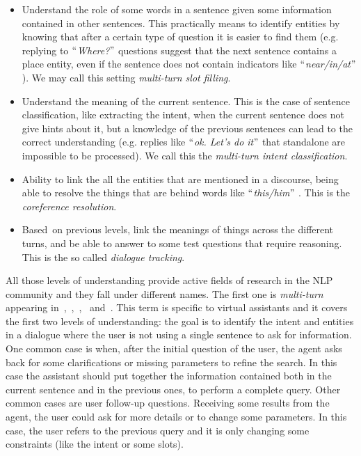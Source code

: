 \begin{itemize}
	\item Understand the role of some words in a sentence given some information contained in other sentences. This practically means to identify entities by knowing that after a certain type of question it is easier to find them (e.g. replying to $``$\textit{Where?}$"$  questions suggest that the next sentence contains a place entity, even if the sentence does not contain indicators like $``$\textit{near/in/at}$"$ ). We may call this setting \textit{multi-turn slot filling}.

	\item Understand the meaning of the current sentence. This is the case of sentence classification, like extracting the intent, when the current sentence does not give hints about it, but a knowledge of the previous sentences can lead to the correct understanding (e.g. replies like $``$\textit{ok. Let's do it}$"$  that standalone are impossible to be processed). We call this the \textit{multi-turn intent classification}.

	\item Ability to link the all the entities that are mentioned in a discourse, being able to resolve the things that are behind words like $``$\textit{this/him}$"$ . This is the \textit{coreference resolution}.

	\item Based\ on previous levels, link the meanings of things across the different turns, and be able to answer to some test questions that require reasoning. This is the so called  \textit{dialogue tracking}.
\end{itemize}

All those levels of understanding provide active fields of research in the NLP community and they fall under different names. The first one is \textit{multi-turn} appearing in~\cite{chen2016end},~\cite{chen2017dynamic},~\cite{xu2014contextual},~\cite{bhargava2013easy} and~\cite{shi2015contextual}. This term is specific to virtual assistants and it covers the first two levels of understanding: the goal is to identify the intent and entities in a dialogue where the user is not using a single sentence to ask for information. One common case is when, after the initial question of the user, the agent asks back for some clarifications or missing parameters to refine the search. In this case the assistant should put together the information contained both in the current sentence and in the previous ones, to perform a complete query. Other common cases are user follow-up questions. Receiving some results from the agent, the user could ask for more details or to change some parameters. In this case, the user refers to the previous query and it is only changing some constraints (like the intent or some slots).

